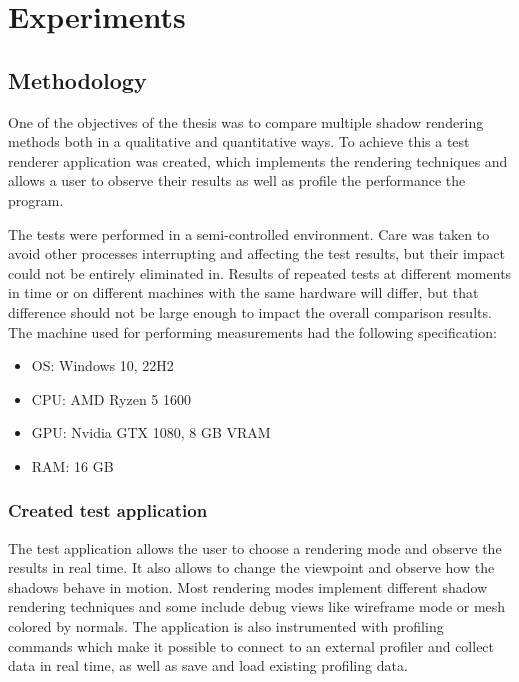 \chapter{Experiments}

\section{Methodology}
One of the objectives of the thesis was to compare multiple shadow rendering methods both in a qualitative and quantitative ways. To achieve this a test renderer application was created, which implements the rendering techniques and allows a user to observe their results as well as profile the performance the program.

The tests were performed in a semi-controlled environment. Care was taken to avoid other processes interrupting and affecting the test results, but their impact could not be entirely eliminated in. Results of repeated tests at different moments in time or on different machines with the same hardware will differ, but that difference should not be large enough to impact the overall comparison results. 
The machine used for performing measurements had the following specification:
\begin{itemize}
    \item OS: Windows 10, 22H2
    \item CPU: AMD Ryzen 5 1600
    \item GPU: Nvidia GTX 1080, 8 GB VRAM
    \item RAM: 16 GB
\end{itemize}

\subsection{Created test application}
The test application allows the user to choose a rendering mode and observe the results in real time. It also allows to change the viewpoint and observe how the shadows behave in motion. Most rendering modes implement different shadow rendering techniques and some include debug views like wireframe mode or mesh colored by normals. The application is also instrumented with profiling commands which make it possible to connect to an external profiler and collect data in real time, as well as save and load existing profiling data.

